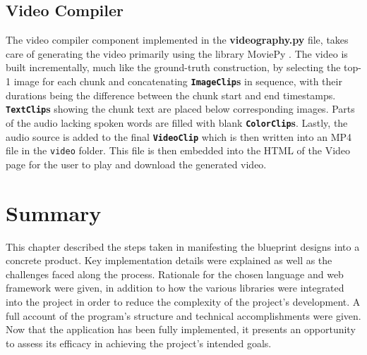 \documentclass{l4proj}
\begin{document}
\subsection{Video Compiler}
The video compiler component implemented in the \textbf{videography.py} file, takes care of generating the video primarily using the library MoviePy \citep{moviepy}. The video is built incrementally, much like the ground-truth construction, by selecting the top-1 image for each chunk and concatenating \textbf{\lstinline|ImageClip|s} in sequence, with their durations being the difference between the chunk start and end timestamps. \textbf{\lstinline|TextClip|s} showing the chunk text are placed below corresponding images. Parts of the audio lacking spoken words are filled with blank \textbf{\lstinline|ColorClip|s}. Lastly, the audio source is added to the final \textbf{\lstinline|VideoClip|} which is then written into an MP4 file in the \lstinline|video| folder. This file is then embedded into the HTML of the Video page for the user to play and download the generated video.


\section{Summary}
This chapter described the steps taken in manifesting the blueprint designs into a concrete product. Key implementation details were explained as well as the challenges faced along the process. Rationale for the chosen language and web framework were given, in addition to how the various libraries were integrated into the project in order to reduce the complexity of the project's development. A full account of the program's structure and technical accomplishments were given. Now that the application has been fully implemented, it presents an opportunity to assess its efficacy in achieving the project's intended goals.


\end{document}
